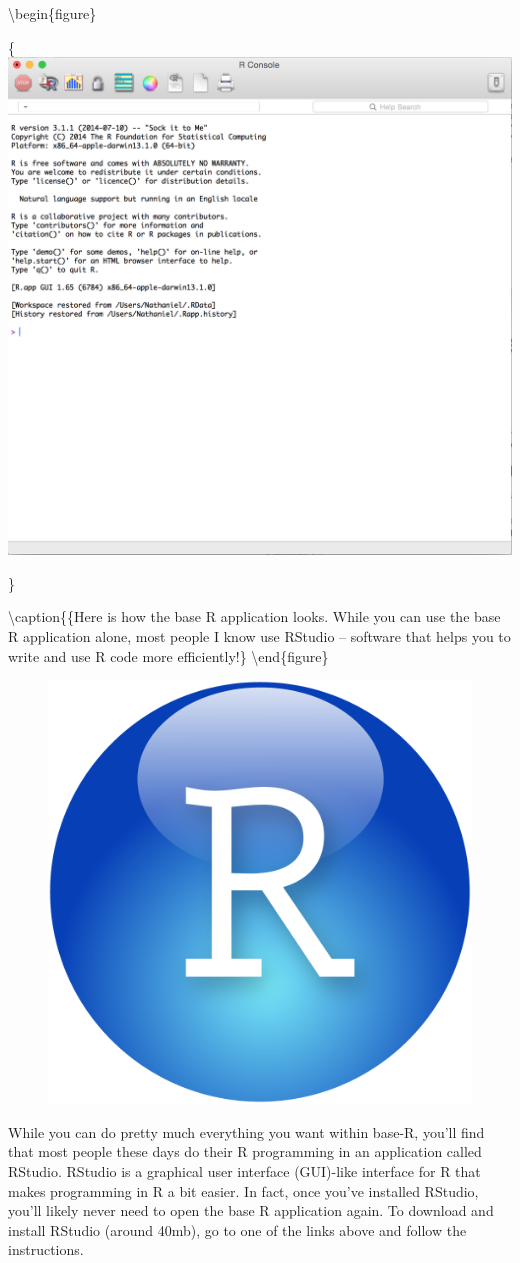 \documentclass[]{book}
\theoremstyle{definition}
\theoremstyle{definition}
\theoremstyle{remark}
\begin{document}
\textbackslash{}begin\{figure\}

\{\centering \includegraphics[width=0.75\linewidth]{images/RScreenshot}

\}

\textbackslash{}caption\{\{Here is how the base R application looks.
While you can use the base R application alone, most people I know use
RStudio -- software that helps you to write and use R code more
efficiently!\}\label{fig:rscreenshot} \textbackslash{}end\{figure\}

\begin{figure}

{\centering \includegraphics[width=0.4\linewidth]{images/RStudio} 

}

\end{figure}

While you can do pretty much everything you want within base-R, you'll
find that most people these days do their R programming in an
application called RStudio. RStudio is a graphical user interface
(GUI)-like interface for R that makes programming in R a bit easier. In
fact, once you've installed RStudio, you'll likely never need to open
the base R application again. To download and install RStudio (around
40mb), go to one of the links above and follow the instructions.
\end{document}
